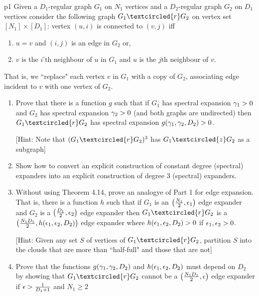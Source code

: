\documentclass[a4paper, 11pt]{article}
\begin{document}

\begin{problem}{%
	}{p1%
	}
	Given a $D_1$-regular graph $G_1$ on $N_1$ vertices and a $D_2$-regular graph $G_2$ on $D_1$ vertices consider the following graph $G_1\textcircled{r}G_2$ on vertex set $[N_1]\times [D_1]$: vertex $(u,i)$ is connected to $(v,j)$ iff \begin{enumerate}[label=(\alph*)]
		\item $u=v$ and $(i,j)$ is an edge in $G_2$ or,
		\item $v$ is the $i$'th neighbour of $u$ in $G_1$ and $u$ is the $j$th neighbour of $v$. 
	\end{enumerate}
	That is, we ``replace" each vertex $v$ in $G_1$ with a copy of $G_2$, associating edge incident to $v$ with one vertex of $G_2$.
	\begin{enumerate}
		\item Prove that there is a function $g$ such that if $G_1$ has spectral expansion $\gamma_1>0$ and $G_2$ has spectral expansion $\gamma_2>0$ (and both graphs are undirected) then $G_1\textcircled{r}G_2$ has spectral expansion $g(\gamma_1,\gamma_2,D_2)>0$.
		
		[Hint: Note that $(G_1\textcircled{r}G_2)^3$ has $G_1\textcircled{z}G_2$ as a subgraph]
		\item Show how to convert an explicit construction of constant degree (spectral) expanders into an explicit construction of degree 3 (spectral) expanders.
		\item Without using Theorem 4.14, prove an analogye of Part 1 for edge expansion. That is, there is a function $h$ such that if $G_1$ is an $\left(\frac{N_1}2,\epsilon_1\right)$ edge expander and $G_2$ is a $\left(\frac{D_1}2,\epsilon_2\right)$ edge expander then $G_1\textcircled{r}G_2$ is a $\left(\frac{N_1D_1}{2},h(\epsilon_1,\epsilon_2,D_2)\right)$ edge expander where $h(\epsilon_1,\epsilon_2,D_2)>0$ if $\epsilon_1,\epsilon_2>0$. 
		
		[Hint: Given any set $S$ of vertices of $G_1\textcircled{r}G_2$, partition $S$ into the clouds that are more than ``half-full" and those that are not]
		\item Prove that the functions $g(\gamma_1,\gamma_2,D_2)$ and $h(\epsilon_1,\epsilon_2,D_2)$ must depend on $D_2$ by showing that $G_1\textcircled{r}G_2$ cannot be a $\left(\frac{N_1D_1}2,\epsilon\right)$ edge expander if $\epsilon>\frac1{D_1+1}$ and $N_1\geq 2$
	\end{enumerate}
\end{problem}
\end{document}
